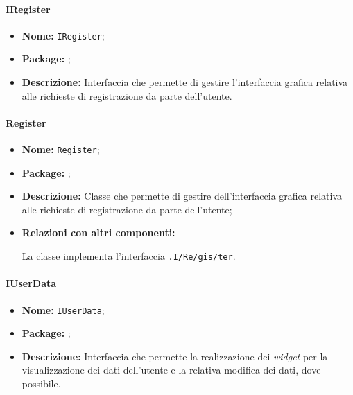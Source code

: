 \paragraph{IRegister}
\begin{itemize}
\item \textbf{Nome:} \texttt{IRegister};
\item \textbf{Package:} \texttt{\viewUser{}};
\item \textbf{Descrizione:} Interfaccia che permette di gestire l'interfaccia grafica relativa alle richieste di registrazione da parte dell'utente.
\end{itemize}

\paragraph{Register}
\begin{flushleft}
\begin{itemize}
\item \textbf{Nome:} \texttt{Register};
\item \textbf{Package:} \texttt{\viewUser{}};
\item \textbf{Descrizione:} Classe che permette di gestire dell'interfaccia grafica relativa alle richieste di registrazione da parte dell'utente;
\item \textbf{Relazioni con altri componenti:}
\begin{sloppypar}
La classe implementa l'interfaccia \texttt{\viewUser{}.I\fshyp{}Re\fshyp{}gis\fshyp{}ter}.
\end{sloppypar}
\end{itemize}
\end{flushleft}

\paragraph{IUserData}
\begin{itemize}
\item \textbf{Nome:} \texttt{IUserData};
\item \textbf{Package:} \texttt{\viewUser{}};
\item \textbf{Descrizione:} Interfaccia che permette la realizzazione dei \textit{widget} per la visualizzazione dei dati dell'utente e la relativa modifica dei dati, dove possibile.
\end{itemize}

